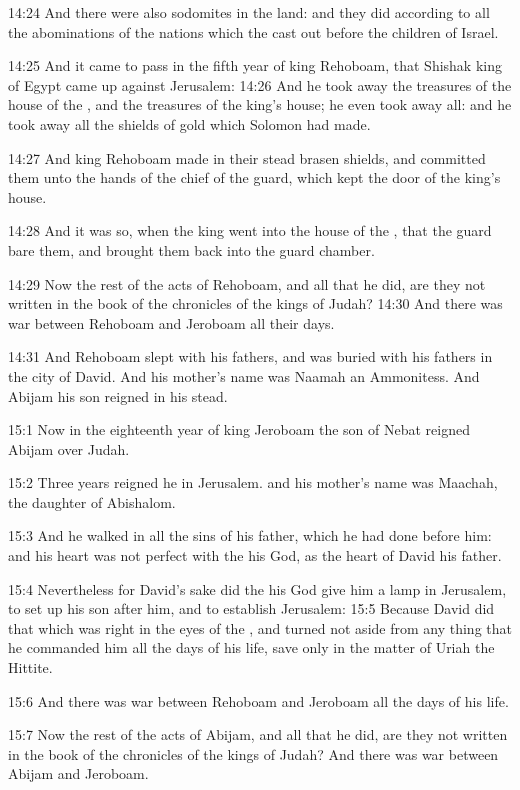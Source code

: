 14:24 And there were also sodomites in the land: and they did
according to all the abominations of the nations which the \LORD cast
out before the children of Israel.

14:25 And it came to pass in the fifth year of king Rehoboam, that
Shishak king of Egypt came up against Jerusalem: 14:26 And he took
away the treasures of the house of the \LORD, and the treasures of the
king's house; he even took away all: and he took away all the shields
of gold which Solomon had made.

14:27 And king Rehoboam made in their stead brasen shields, and
committed them unto the hands of the chief of the guard, which kept
the door of the king's house.

14:28 And it was so, when the king went into the house of the \LORD,
that the guard bare them, and brought them back into the guard
chamber.

14:29 Now the rest of the acts of Rehoboam, and all that he did, are
they not written in the book of the chronicles of the kings of Judah?
14:30 And there was war between Rehoboam and Jeroboam all their days.

14:31 And Rehoboam slept with his fathers, and was buried with his
fathers in the city of David. And his mother's name was Naamah an
Ammonitess. And Abijam his son reigned in his stead.

15:1 Now in the eighteenth year of king Jeroboam the son of Nebat
reigned Abijam over Judah.

15:2 Three years reigned he in Jerusalem. and his mother's name was
Maachah, the daughter of Abishalom.

15:3 And he walked in all the sins of his father, which he had done
before him: and his heart was not perfect with the \LORD his God, as
the heart of David his father.

15:4 Nevertheless for David's sake did the \LORD his God give him a
lamp in Jerusalem, to set up his son after him, and to establish
Jerusalem: 15:5 Because David did that which was right in the eyes of
the \LORD, and turned not aside from any thing that he commanded him
all the days of his life, save only in the matter of Uriah the
Hittite.

15:6 And there was war between Rehoboam and Jeroboam all the days of
his life.

15:7 Now the rest of the acts of Abijam, and all that he did, are they
not written in the book of the chronicles of the kings of Judah? And
there was war between Abijam and Jeroboam.

